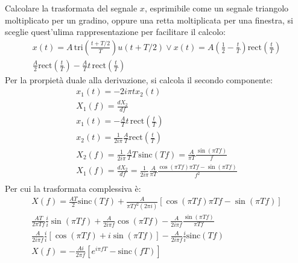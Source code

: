 \documentclass{article}
\numberwithin{equation}{subsection}
\begin{document}
Calcolare la trasformata del segnale $x$, esprimibile come un segnale triangolo moltiplicato per un gradino, oppure una retta moltiplicata per una finestra, si sceglie 
quest'ulima rappresentazione per facilitare il calcolo:
\begin{gather*}
    x(t)=A\,\displaystyle\mbox{tri}\left(\frac{t+T/2}{T}\right)u(t+T/2)\lor x(t)=A\left(\frac{1}{2}-\frac{t}{T}\right)\mbox{rect}\left(\frac{t}{T}\right)\\
    \displaystyle\frac{A}{2}\mbox{rect}\left(\frac{t}{T}\right)-\frac{A}{T}t\,\mbox{rect}\left(\frac{t}{T}\right)
\end{gather*}
Per la prorpietà duale alla derivazione, si calcola il secondo componente: 
\begin{gather*}
    x_1(t)=-2i\pi tx_2(t)\\
    X_1(f)=\displaystyle\frac{dX_2}{df}\\
    x_1(t)=-\displaystyle\frac{A}{T}t\,\mbox{rect}\left(\frac{t}{T}\right)\\
    x_2(t)=\displaystyle\frac{1}{2i\pi}\frac{A}{T}\mbox{rect}\left(\frac{t}{T}\right)\\
    X_2(f)=\displaystyle\frac{1}{2i\pi}\frac{A}{T}T\,\mbox{sinc}(Tf)=\frac{A}{\pi T}\frac{\sin(\pi Tf)}{f}\\
    X_1(f)=\displaystyle\frac{dX_2}{df}=\frac{1}{2i\pi}\frac{A}{\pi T}\frac{\cos(\pi Tf)\pi Tf-\sin(\pi Tf)}{f^2}\\
\end{gather*}
Per cui la trasformata complessiva è:
\begin{gather*}
    X(f)=\displaystyle\frac{AT}{2}\mbox{sinc}(Tf)+\frac{A}{\pi Tf^2(2\pi i)}\left[\cos(\pi Tf)\pi Tf-\sin (\pi Tf)\right]\\
    \displaystyle\frac{AT}{2\pi Tf}\frac{i}{i}\sin(\pi Tf)+\frac{A}{2i\pi f}\cos(\pi Tf)-\frac{A}{2i\pi f}\frac{\sin(\pi Tf)}{\pi Tf}\\
    \displaystyle\frac{A}{2i\pi f}\frac{i}{i}\left[\cos(\pi Tf)+i\sin(\pi Tf)\right]-\frac{A}{2i\pi f}\frac{i}{i}\mbox{sinc}( Tf)\\
    X(f)=\displaystyle-\frac{Ai}{2\pi f}\left[e^{i\pi fT}-\mbox{sinc}(fT)\right]
\end{gather*}
\end{document}

